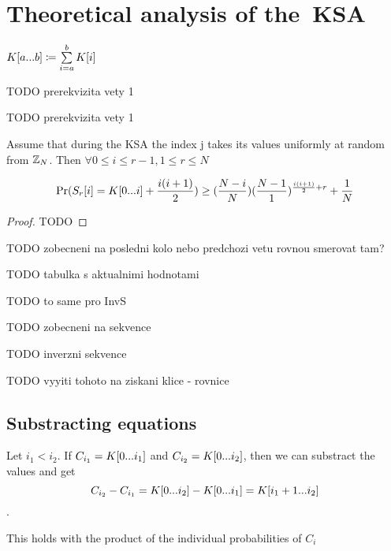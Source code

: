 \chapter{Theoretical analysis of the~KSA}
\begin{notation}
	$ K[{a}...{b}] \coloneqq \sum\limits_{i=a}^{b}K[i]$
\end{notation}


\begin{lemma}
	TODO prerekvizita vety 1
\end{lemma}

\begin{lemma}
	TODO prerekvizita vety 1
\end{lemma}


\begin{thm}{\cite{GoMa}}
	Assume that during the KSA the index j takes its values uniformly at random from $ \mathbb{Z}_{N} $. Then $ \forall 0 \leq i \leq r-1, 1 \leq r \leq N $
	
	\[ \Pr(S_{r}[i] = K[{0}...{i}] + \dfrac{i(i+1)}{2})   \geq (\dfrac{N - i}{N})(\dfrac{N-1}{1})^{\frac{i(i+1)}{2}+r}+\dfrac{1}{N} \]
\end{thm}

\begin{proof}
	TODO
\end{proof}



\begin{cor}
	TODO zobecneni na posledni kolo nebo predchozi vetu rovnou smerovat tam?
\end{cor}


TODO tabulka s aktualnimi hodnotami 


TODO to same pro InvS

TODO zobecneni na sekvence


TODO inverzni sekvence

TODO vyyiti tohoto na ziskani klice - rovnice


\section{Substracting equations}

Let $i_{1} < i_{2} $. If $ C_{i_{1}} = K[{0}...{i_{1}}] $ and $ C_{i_{2}} = K[{0}...{i_{2}}] $, then we can substract the values and get
\[ C_{i_{2}} - C_{i_{1}} = K[{0}...{i_{2}}] - K[{0}...{i_{1}}] = K[{i_{1} + 1}...{i_{2}}]	\].

This holds with the product of the individual probabilities of $ C_{i} $


